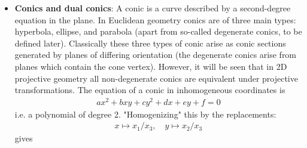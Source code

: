\documentclass{report}
\begin{document}
\begin{itemize}
            \bigbreak \noindent 
            \textbf{Note:} A hyperbola is not the only cut that passes through both nappes (halves) of a double cone
            \bigbreak \noindent 
            A \textbf{degenerate hyperbola}—two intersecting straight lines—also happens when a plane cuts through both halves of the double cone, provided the plane passes directly through the apex (vertex)
            \begin{itemize}
                \item \textbf{Non-degenerate cut (not through the apex):} A plane that cuts both halves of the double cone without hitting the vertex produces a hyperbola (two separate, curved branches).
                \item \textbf{Degenerate cut (through the apex):} A plane that cuts both halves of the double cone and passes through the vertex produces two intersecting lines.
                \item \textbf{Single-nappe cuts:} Circles, ellipses, parabolas—and their degenerate forms (a single point or a single line)—stay on one nappe of the cone (except a parabola, which touches the line at infinity, or a single line that lies along the generator of both nappes)
            \end{itemize}
        \item \textbf{Conics and dual conics}: A conic is a curve described by a second-degree equation in the plane. In Euclidean geometry conics are of three main types: hyperbola, ellipse, and parabola (apart from so-called degenerate conics, to be defined later). Classically these three types of conic arise as conic sections generated by planes of differing orientation (the degenerate conics arise from planes which contain the cone vertex). However, it will be seen that in 2D projective geometry all non-degenerate conics are equivalent under projective transformations.
            \bigbreak \noindent
            The equation of a conic in inhomogeneous coordinates is
            \begin{align*}
                ax^{2} + bxy + cy^{2} + dx + ey + f = 0
            \end{align*}
            i.e. a polynomial of degree 2. "Homogenizing" this by the replacements: 
            \begin{align*}
                x\mapsto x_{1}/x_{3},\quad  y\mapsto x_{2}/x_{3}
            \end{align*}
            gives
            \begin{align*}

\end{align*}
\end{itemize}
\end{document}
